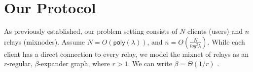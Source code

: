









\clearpage


\section{Our Protocol}

As previously established, our problem setting consists of $N$ clients (users) and $n$ relays (mixnodes). Assume $N = O(\mathsf{poly}(\lambda))$, and $n = O(\frac{N}{log^2 \lambda})$. While each client has a direct connection to every relay, we model the mixnet of relays as an $r$-regular, $\beta$-expander graph, where $r > 1$. We can write $\beta = \Theta(1/r)$ \cite[Section 2.3]{Hoory2006}.\\

